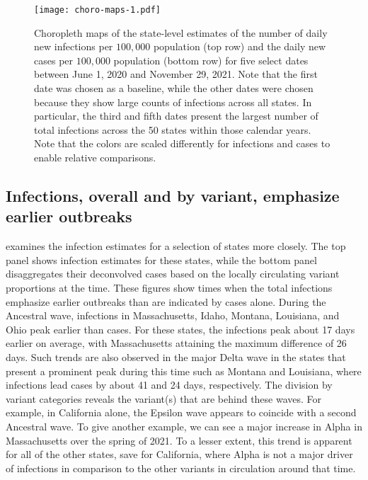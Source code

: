 \begin{figure}[!tb]
\centering
\texttt{[image: choro-maps-1.pdf]}
\caption{Choropleth maps of the state-level estimates of the number of daily new
infections per $100,000$ population (top row) and the daily new cases per
$100,000$ population (bottom row) for five select dates between June 1, 2020 and
November 29, 2021. Note that the first date was chosen as a baseline, while the
other dates were chosen because they show large counts of infections across
all states. In particular, the third and fifth dates present the largest number
of total infections across the 50 states within those calendar years. Note that
the colors are scaled differently for infections and cases to enable relative comparisons.} 
\label{fig:choro_inf_case_rates}
\end{figure}    



    
\subsection{Infections, overall and by variant, emphasize earlier outbreaks}
\label{sec:infections-by-voc}

 examines the infection estimates for a selection of states
more closely. The top panel shows infection estimates for these states, while
the bottom panel disaggregates their deconvolved cases based on the locally
circulating variant proportions at the time. These figures show times when the
total infections emphasize earlier outbreaks than are indicated by cases alone.
During the Ancestral wave, infections in Massachusetts, Idaho, Montana,
Louisiana, and Ohio peak earlier than cases. For these states, the infections
peak about 17 days earlier on average, with Massachusetts attaining the maximum
difference of 26 days. Such trends are also observed in the major Delta wave in
the states that present a prominent peak during this time such as Montana and
Louisiana, where infections lead cases by about 41 and 24 days, respectively.
The division by variant categories reveals the variant(s) that are behind these
waves. For example, in California alone, the Epsilon wave appears to coincide
with a second Ancestral wave. To give another example, we can see a
major increase in Alpha in Massachusetts over the spring of 2021. To a lesser
extent, this trend is apparent for all of the other states, save for California,
where Alpha is not a major driver of infections in comparison to the other
variants in circulation around that time. 

